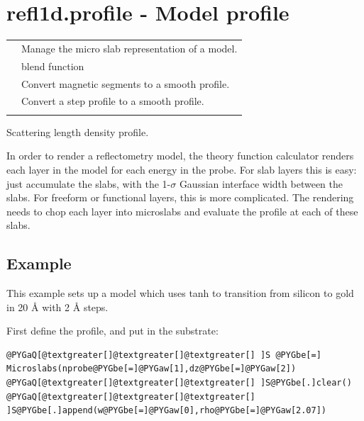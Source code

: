 \documentclass[letterpaper,10pt,english]{sphinxmanual}
\begin{document}
\section{refl1d.profile - Model profile}
\label{api/profile::doc}\label{api/profile:refl1d-profile-model-profile}
\begin{tabulary}{\linewidth}{LL}
\hline

{\hyperref[api/profile:refl1d.profile.Microslabs]{}}
 & 
Manage the micro slab representation of a model.
\\

{\hyperref[api/profile:refl1d.profile.blend]{}}
 & 
blend function
\\

{\hyperref[api/profile:refl1d.profile.build_mag_profile]{}}
 & 
Convert magnetic segments to a smooth profile.
\\

{\hyperref[api/profile:refl1d.profile.build_profile]{}}
 & 
Convert a step profile to a smooth profile.
\\

{\hyperref[api/profile:refl1d.profile.compute_limited_sigma]{}}
 & 

\\
\hline
\end{tabulary}

\label{api/profile:module-refl1d.profile}
Scattering length density profile.

In order to render a reflectometry model, the theory function calculator
renders each layer in the model for each energy in the probe.  For slab
layers this is easy: just accumulate the slabs, with the 1-$\sigma$ Gaussian
interface width between the slabs.  For freeform or functional layers,
this is more complicated.  The rendering needs to chop each layer into
microslabs and evaluate the profile at each of these slabs.


\subsection{Example}
\label{api/profile:example}
This example sets up a model which uses tanh to transition from
silicon to gold in 20 Å with 2 Å steps.

First define the profile, and put in the substrate:

\begin{Verbatim}[commandchars=@\[\]]
@PYGaQ[@textgreater[]@textgreater[]@textgreater[] ]S @PYGbe[=] Microslabs(nprobe@PYGbe[=]@PYGaw[1],dz@PYGbe[=]@PYGaw[2])
@PYGaQ[@textgreater[]@textgreater[]@textgreater[] ]S@PYGbe[.]clear()
@PYGaQ[@textgreater[]@textgreater[]@textgreater[] ]S@PYGbe[.]append(w@PYGbe[=]@PYGaw[0],rho@PYGbe[=]@PYGaw[2.07])
\end{Verbatim}
\end{document}
